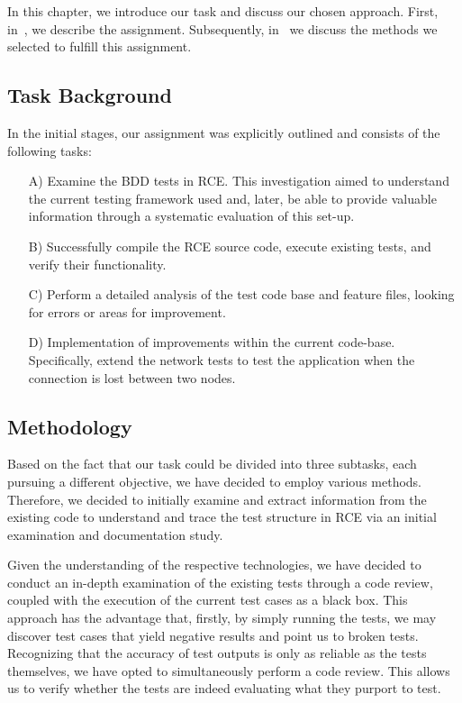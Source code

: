 \label{sec:method}
In this chapter, we introduce our task and discuss our chosen approach. First, in~, we describe the assignment. Subsequently, in~ we discuss the methods we selected to fulfill this assignment.

\subsection{Task Background}
\label{subsec:Task}
In the initial stages, our assignment was explicitly outlined and consists of the following tasks: 
\begin{enumerate}
    \item[A)] Examine the \ac{BDD} tests in \ac{RCE}. This investigation aimed to understand the current testing framework used and, later, be able to provide valuable information through a systematic evaluation of this set-up.
    \item[B)] Successfully compile the \ac{RCE} source code, execute existing tests, and verify their functionality.
    \item[C)] Perform a detailed analysis of the test code base and feature files, looking for errors or areas for improvement.
    \item[D)] Implementation of improvements within the current code-base. Specifically, extend the network tests to test the application when the connection is lost between two nodes. 
\end{enumerate}

\subsection{Methodology}
\label{subsec:Methodologies}
Based on the fact that our task could be divided into three subtasks, each pursuing a different objective, we have decided to employ various methods. Therefore, we decided to initially examine and extract information from the existing code to understand and trace the test structure in \ac{RCE} via an initial examination and documentation study.

Given the understanding of the respective technologies, we have decided to conduct an in-depth examination of the existing tests through a code review, coupled with the execution of the current test cases as a black box. This approach has the advantage that, firstly, by simply running the tests, we may discover test cases that yield negative results and point us to broken tests. Recognizing that the accuracy of test outputs is only as reliable as the tests themselves, we have opted to simultaneously perform a code review. This allows us to verify whether the tests are indeed evaluating what they purport to test. 

